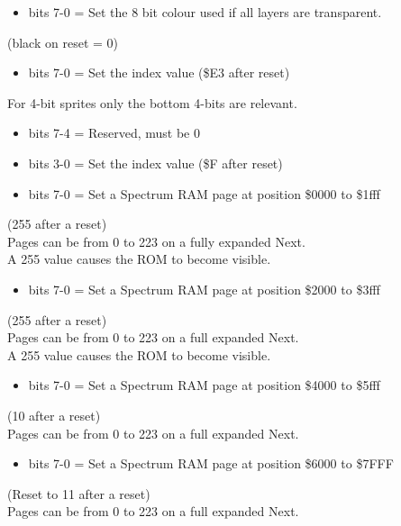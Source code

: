 \begin{itemize}
\item bits 7-0 = Set the 8 bit colour used if all layers are transparent.
\end{itemize}
(black on reset = 0)

\begin{itemize}
\item bits 7-0 = Set the index value (\$E3 after reset)
\end{itemize}
For 4-bit sprites only the bottom 4-bits are relevant.

\begin{itemize}
\item bits 7-4 = Reserved, must be 0
\item bits 3-0 = Set the index value (\$F after reset)
\end{itemize}

\begin{itemize}
\item bits 7-0 = Set a Spectrum RAM page at position \$0000 to \$1fff
\end{itemize}
(255 after a reset)\\
Pages can be from 0 to 223 on a fully expanded Next.\\
A 255 value causes the ROM to become visible.

\begin{itemize}
\item bits 7-0 = Set a Spectrum RAM page at position \$2000 to \$3fff
\end{itemize}
(255 after a reset)\\
Pages can be from 0 to 223 on a full expanded Next.\\
A 255 value causes the ROM to become visible.

\begin{itemize}
\item bits 7-0 = Set a Spectrum RAM page at position \$4000 to \$5fff
\end{itemize}
(10 after a reset)\\
Pages can be from 0 to 223 on a full expanded Next.

\begin{itemize}
\item bits 7-0 = Set a Spectrum RAM page at position \$6000 to \$7FFF
\end{itemize}
(Reset to 11 after a reset)\\
Pages can be from 0 to 223 on a full expanded Next.

